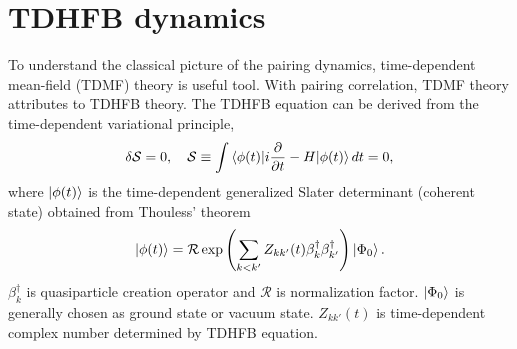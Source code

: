 \documentclass[11pt]{book} %
\begin{document}
\section{TDHFB dynamics}
To understand the classical picture of the pairing dynamics, time-dependent mean-field (TDMF) theory is useful tool. With pairing correlation, TDMF theory attributes to TDHFB theory.
The TDHFB equation can be derived from the time-dependent variational principle,
\begin{equation}
  \delta\mathcal{S}=0, \quad 
  \mathcal{S} \equiv \int \braket{\phi(t)|i\frac{\partial}{\partial t}-H|\phi(t)}dt = 0 ,
\end{equation}
where $\ket{\phi(t)}$ is the time-dependent generalized Slater determinant (coherent state) obtained from Thouless' theorem
\begin{equation}
  \ket{\phi(t)} = \mathcal{R}\exp{\left( \sum_{k<k'}Z_{kk'}(t)\beta_k^{\dag}\beta_{k'}^{\dag}
    \right)}\ket{\Phi_0} .
\end{equation}
$\beta_k^{\dag}$ is quasiparticle creation operator and $\mathcal{R}$ is normalization factor. $\ket{\Phi_0}$ is generally chosen as ground state or vacuum state. $Z_{kk'}(t)$ is time-dependent complex number determined by TDHFB equation.
\end{document}
